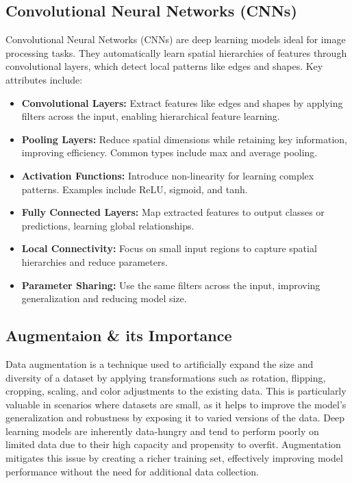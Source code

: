 \documentclass[12pt]{article}
\begin{document}
\subsection{Convolutional Neural Networks (CNNs)}
Convolutional Neural Networks (CNNs) are deep learning models ideal for image processing tasks. They automatically learn spatial hierarchies of features through convolutional layers, which detect local patterns like edges and shapes. Key attributes include:
\begin{itemize}
    \item \textbf{Convolutional Layers:} Extract features like edges and shapes by applying filters across the input, enabling hierarchical feature learning.
    \item \textbf{Pooling Layers:} Reduce spatial dimensions while retaining key information, improving efficiency. Common types include max and average pooling.
    \item \textbf{Activation Functions:} Introduce non-linearity for learning complex patterns. Examples include ReLU, sigmoid, and tanh.
    \item \textbf{Fully Connected Layers:} Map extracted features to output classes or predictions, learning global relationships.
    \item \textbf{Local Connectivity:} Focus on small input regions to capture spatial hierarchies and reduce parameters.
    \item \textbf{Parameter Sharing:} Use the same filters across the input, improving generalization and reducing model size.
\end{itemize}

\clearpage

\subsection{Augmentaion \& its Importance}
Data augmentation is a technique used to artificially expand the size and diversity of a dataset by applying transformations such as rotation, flipping, cropping, scaling, and color adjustments to the existing data. This is particularly valuable in scenarios where datasets are small, as it helps to improve the model's generalization and robustness by exposing it to varied versions of the data. Deep learning models are inherently data-hungry and tend to perform poorly on limited data due to their high capacity and propensity to overfit. Augmentation mitigates this issue by creating a richer training set, effectively improving model performance without the need for additional data collection.
\end{document}
